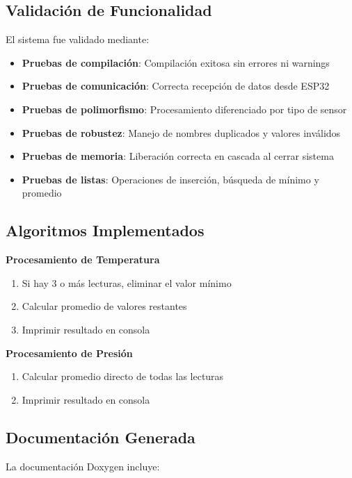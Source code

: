 \documentclass[conference]{IEEEtran}
\begin{document}
\subsection{Validación de Funcionalidad}

El sistema fue validado mediante:

\begin{itemize}
    \item \textbf{Pruebas de compilación}: Compilación exitosa sin errores ni warnings
    \item \textbf{Pruebas de comunicación}: Correcta recepción de datos desde ESP32
    \item \textbf{Pruebas de polimorfismo}: Procesamiento diferenciado por tipo de sensor
    \item \textbf{Pruebas de robustez}: Manejo de nombres duplicados y valores inválidos
    \item \textbf{Pruebas de memoria}: Liberación correcta en cascada al cerrar sistema
    \item \textbf{Pruebas de listas}: Operaciones de inserción, búsqueda de mínimo y promedio
\end{itemize}

\subsection{Algoritmos Implementados}

\textbf{Procesamiento de Temperatura}
\begin{enumerate}
    \item Si hay 3 o más lecturas, eliminar el valor mínimo
    \item Calcular promedio de valores restantes
    \item Imprimir resultado en consola
\end{enumerate}

\textbf{Procesamiento de Presión}
\begin{enumerate}
    \item Calcular promedio directo de todas las lecturas
    \item Imprimir resultado en consola
\end{enumerate}

\subsection{Documentación Generada}

La documentación Doxygen incluye:
\end{document}
